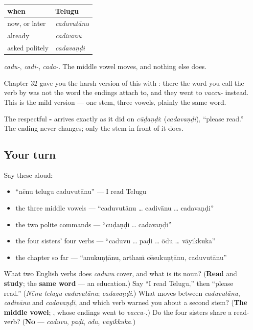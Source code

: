 \begin{grammarlens}[title={Grammar Lens: one stem, three middle vowels}]
\noindent
\begin{tabularx}{\linewidth}{@{}>{\raggedright\arraybackslash}X>{\raggedright\arraybackslash}X@{}}
\toprule
\textbf{when} & \textbf{Telugu} \\
\midrule
now, or later & \emph{caduvutānu} \\
already & \emph{cadivānu} \\
asked politely & \emph{cadavaṇḍi} \\
\bottomrule
\end{tabularx}

\emph{cadu-}, \emph{cadi-}, \emph{cada-}. The middle vowel moves, and nothing else does.

Chapter 32 gave you the harsh version of this with \textbf{}: there the word you call the verb by was not the word the endings attach to, and they went to \emph{vaccu-} instead. This is the mild version — one stem, three vowels, plainly the same word.

The respectful \textbf{-} arrives exactly as it did on \emph{cūḍaṇḍi}: \textbf{} (\emph{cadavaṇḍi}), \textquotedblleft{}please read.\textquotedblright{} The ending never changes; only the stem in front of it does.
\end{grammarlens}

\subsection*{Your turn}
Say these aloud:

\begin{itemize}
\raggedright
  \item \textquotedblleft{}nēnu telugu caduvutānu\textquotedblright{} — I read Telugu
  \item the three middle vowels — \textquotedblleft{}caduvutānu … cadivānu … cadavaṇḍi\textquotedblright{}
  \item the two polite commands — \textquotedblleft{}cūḍaṇḍi … cadavaṇḍi\textquotedblright{}
  \item the four sisters' four verbs — \textquotedblleft{}caduvu … paḍi … ōdu … vāyikkuka\textquotedblright{}
  \item the chapter so far — \textquotedblleft{}anukuṇṭānu, arthaṁ cēsukuṇṭānu, caduvutānu\textquotedblright{}
\end{itemize}

\begin{tcolorbox}[breakable,colback=teal!4,colframe=teal!35!black,title={Before you move on}]
What two English verbs does \emph{caduvu} cover, and what is its noun? (\textbf{Read} and \textbf{study}; the \textbf{same word} — an education.) Say \textquotedblleft{}I read Telugu,\textquotedblright{} then \textquotedblleft{}please read.\textquotedblright{} (\emph{Nēnu telugu caduvutānu}; \emph{cadavaṇḍi}.) What moves between \emph{caduvutānu}, \emph{cadivānu} and \emph{cadavaṇḍi}, and which verb warned you about a second stem? (\textbf{The middle vowel}; \textbf{}, whose endings went to \emph{vaccu-}.) Do the four sisters share a read-verb? (\textbf{No} — \emph{caduvu}, \emph{paḍi}, \emph{ōdu}, \emph{vāyikkuka}.)
\end{tcolorbox}
